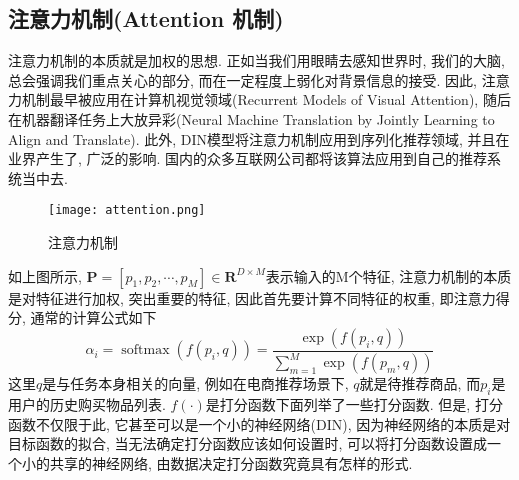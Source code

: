 \subsection{注意力机制(Attention 机制)}
注意力机制的本质就是加权的思想. 正如当我们用眼睛去感知世界时, 我们的大脑, 总会强调我们重点关心的部分, 而在一定程度上弱化对背景信息的接受. 因此, 注意力机制最早被应用在计算机视觉领域(Recurrent Models of Visual Attention), 随后在机器翻译任务上大放异彩(Neural Machine Translation by Jointly Learning to Align and Translate). 此外, DIN模型将注意力机制应用到序列化推荐领域, 并且在业界产生了, 广泛的影响. 国内的众多互联网公司都将该算法应用到自己的推荐系统当中去. 
\begin{figure}[htbp]
	\centering
	\texttt{[image: attention.png]}
	\caption{注意力机制}
	\label{FIGhtmltext}
\end{figure}
如上图所示, $\boldsymbol{P}=\left[p_{1}, p_{2}, \cdots, p_{M}\right] \in \mathbf{R}^{D \times M}$表示输入的M个特征, 注意力机制的本质是对特征进行加权, 突出重要的特征, 因此首先要计算不同特征的权重, 即注意力得分, 通常的计算公式如下
\begin{equation}
	\alpha_{i}=\operatorname{softmax}\left(f\left(p_{i}, q\right)\right)=\frac{\exp \left(f\left(p_{i}, q\right)\right)}{\sum_{m=1}^{M} \exp \left(f\left(p_{m}, q\right)\right)}
\end{equation}
这里$q$是与任务本身相关的向量, 例如在电商推荐场景下, $q$就是待推荐商品, 而$p_i$是用户的历史购买物品列表. $f(\cdot)$是打分函数下面列举了一些打分函数. 但是, 打分函数不仅限于此, 它甚至可以是一个小的神经网络(DIN), 因为神经网络的本质是对目标函数的拟合, 当无法确定打分函数应该如何设置时, 可以将打分函数设置成一个小的共享的神经网络, 由数据决定打分函数究竟具有怎样的形式.
























